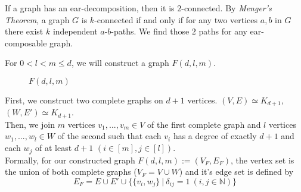 \documentclass[a4paper]{article}
\begin{document}
	\begin{solution}{13}
		\begin{theorem}{If a graph has an ear-decomposition, then it is $2$-connected.}
			By \emph{Menger's Theorem}, a graph $G$ is $k$-connected if and only if for any two vertices $a, b$ in $G$ there exist $k$ independent $a$-$b$-paths. We find those $2$ paths for any ear-composable graph.
		\end{theorem}
	\end{solution}
	\newpage
	\begin{solution}{14}
		For $0 < l < m \leq d$, we will construct a graph $F(d, l, m)$.\\

		\begin{figure}[h]
			\caption{$F(d, l, m)$}
		\end{figure}
		First, we construct two complete graphs on $d+1$ vertices. $(V, E) \simeq K_{d+1}$, $(W, E') \simeq K_{d+1}$.\\

		Then, we join $m$ vertices $v_1, ..., v_m \in V$ of the first complete graph and $l$ vertices $w_1, ..., w_l \in W$ of the second such that each $v_i$ has a degree of exactly $d+1$ and each $w_j$ of at least $d+1$ $(i \in [m], j \in [l])$.\\

		Formally, for our constructed graph $F(d, l, m) := (V_F, E_F)$,  the vertex set is the union of both complete graphs ($V_F = V \cup W$) and it's edge set is defined by
		\begin{equation}
			E_F = E \cup E' \cup \{\{v_i, w_j\}\ |\ \delta_{ij} = 1\ (i, j \in \mathbb{N})\}
		\end{equation}
		

\end{solution}
\end{document}

